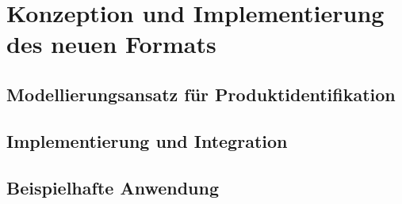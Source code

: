 \chapter{Konzeption und Implementierung des neuen Formats}


\section{Modellierungsansatz für Produktidentifikation}


\section{Implementierung und Integration}


\section{Beispielhafte Anwendung}

